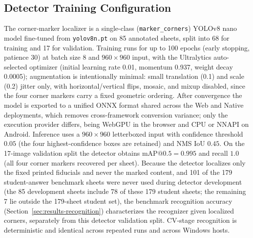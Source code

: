 \documentclass[conference]{IEEEtran}
\begin{document}
\subsection{Detector Training Configuration}
The corner-marker localizer is a single-class (\texttt{marker\_corners})
YOLOv8 nano model fine-tuned from \texttt{yolov8n.pt} on 85 annotated sheets,
split into 68 for training and 17 for validation. Training runs for up to
100 epochs (early stopping, patience 30) at batch size 8 and $960\times960$
input, with the Ultralytics auto-selected optimizer (initial learning rate
0.01, momentum 0.937, weight decay 0.0005); augmentation is intentionally
minimal: small translation (0.1) and scale (0.2) jitter only, with
horizontal/vertical flips, mosaic, and mixup disabled, since the four corner
markers carry a fixed geometric ordering. After convergence the model is
exported to a unified ONNX format shared across the Web and Native
deployments, which removes cross-framework conversion variance; only the
execution provider differs, being WebGPU in the browser and CPU or NNAPI on
Android. Inference uses a $960\times960$ letterboxed input with confidence threshold
$0.05$ (the four highest-confidence boxes are retained) and NMS IoU $0.45$. On the 17-image validation split the
detector obtains $\mathrm{mAP}@0.5{=}0.995$ and recall $1.0$ (all four corner
markers recovered per sheet). Because the detector localizes only the fixed
printed fiducials and never the marked content, and 101 of the 179 student-answer benchmark sheets were never used during
detector development (the 85 development sheets include 78 of these 179 student
sheets; the remaining 7 lie outside the 179-sheet student set), the benchmark recognition
accuracy (Section~\ref{sec:results-recognition}) characterizes the recognizer
given localized corners, separately from this detector validation split.
CV-stage recognition is deterministic and identical across repeated runs and
across Windows hosts.
\end{document}
